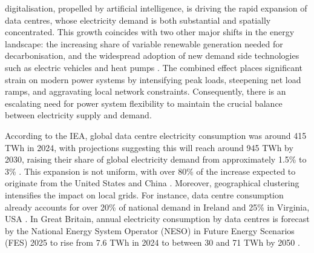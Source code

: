 \documentclass[lettersize,journal]{IEEEtran}
\providecommand{\DIFadd}[1]{{\color{blue}#1}}
\providecommand{\DIFaddbegin}{}
\providecommand{\DIFaddend}{}
\begin{document}
 digitalisation, propelled by artificial intelligence, is driving the rapid expansion of data centres, whose electricity demand is both substantial and spatially concentrated. This growth coincides with two other major shifts in the energy landscape: the increasing share of variable renewable generation needed for decarbonisation, and the widespread adoption of new  \DIFaddbegin \DIFadd{demand side }\DIFaddend technologies such as electric vehicles and heat pumps \cite{Centrica2020LEM, EEAACER2023Flex}. The combined effect places significant strain on modern power systems by intensifying peak loads, steepening net load ramps, and aggravating local network constraints. Consequently, there is an escalating need for power system flexibility to maintain the crucial balance between electricity supply and demand.

According to the IEA, global data centre electricity consumption was around 415 TWh in 2024, with projections suggesting this will  \DIFaddbegin \DIFadd{reach around }\DIFaddend 945 TWh by 2030, raising their share of global electricity demand from approximately 1.5\% to 3\% \cite{iea_energy_ai}. This expansion is not uniform, with over 80\% of the increase expected to originate from the United States and China \cite{iea_energy_ai}. Moreover, geographical clustering intensifies the impact on local grids. For instance, data centre consumption already accounts for over 20\% of national demand in Ireland  and 25\% in Virginia, USA \cite{iea_energy_ai}. In Great Britain, annual electricity consumption by data centres is forecast by  \DIFaddbegin \DIFadd{the National Energy System Operator (NESO) in Future Energy Scenarios (FES) 2025 }\DIFaddend to rise from 7.6 TWh in 2024 to between 30  \DIFaddbegin \DIFadd{and }\DIFaddend 71 TWh by 2050 \cite{neso2025future}.
\end{document}
